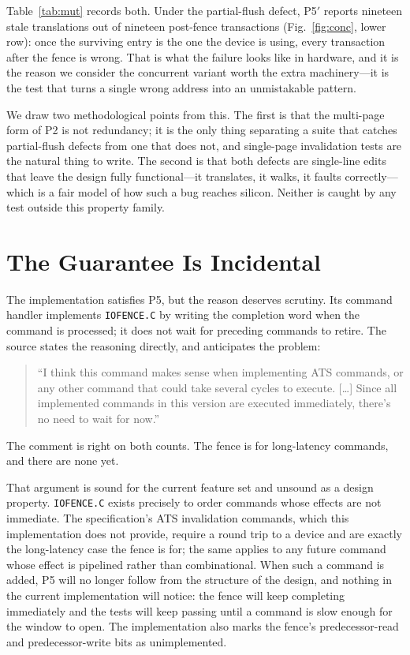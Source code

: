 \documentclass[journal]{IEEEtran}
\newcommand{\cmd}[1]{\mbox{\texttt{#1}}}
\begin{document}
Table~\ref{tab:mut} records both. Under the partial-flush defect, P5$'$ reports
nineteen stale translations out of nineteen post-fence transactions
(Fig.~\ref{fig:conc}, lower row): once the surviving entry is the one the device
is using, every transaction after the fence is wrong. That is what the failure
looks like in hardware, and it is the reason we consider the concurrent variant
worth the extra machinery---it is the test that turns a single wrong address
into an unmistakable pattern.

We draw two methodological points from this. The first is that the multi-page
form of P2 is not redundancy; it is the only thing separating a suite that
catches partial-flush defects from one that does not, and single-page
invalidation tests are the natural thing to write. The second is that both
defects are single-line edits that leave the design fully functional---it
translates, it walks, it faults correctly---which is a fair model of how such a
bug reaches silicon. Neither is caught by any test outside this property family.

\section{The Guarantee Is Incidental}
The implementation satisfies P5, but the reason deserves scrutiny. Its command
handler implements \cmd{IOFENCE.C} by writing the completion word when the
command is processed; it does not wait for preceding commands to retire. The
source states the reasoning directly, and anticipates the problem:

\begin{quote}\footnotesize
``I think this command makes sense when implementing ATS commands, or any other
command that could take several cycles to execute. [\ldots] Since all
implemented commands in this version are executed immediately, there's no need
to wait for now.''
\end{quote}

\noindent The comment is right on both counts. The fence is for long-latency
commands, and there are none yet.

That argument is sound for the current feature set and unsound as a design
property. \cmd{IOFENCE.C} exists precisely to order commands whose effects
are not immediate. The specification's ATS invalidation commands, which this
implementation does not provide, require a round trip to a device and are
exactly the long-latency case the fence is for; the same applies to any future
command whose effect is pipelined rather than combinational. When such a command
is added, P5 will no longer follow from the structure of the design, and nothing
in the current implementation will notice: the fence will keep completing
immediately and the tests will keep passing until a command is slow enough for
the window to open. The implementation also marks the fence's
predecessor-read and predecessor-write bits as unimplemented.
\end{document}
